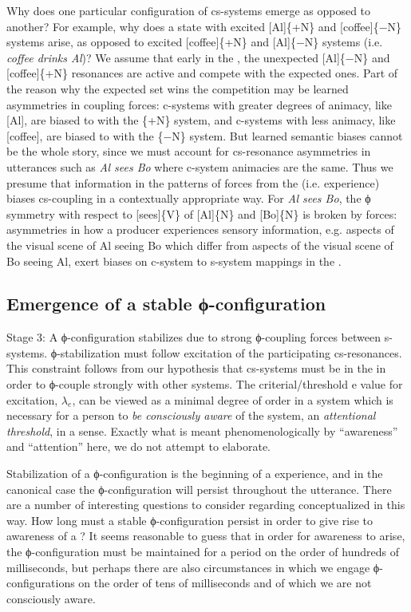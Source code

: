Why does one particular configuration of cs-systems emerge as opposed to another? For example, why does a state with excited [Al]\{+N\} and [coffee]\{−N\} systems arise, as opposed to excited [coffee]\{+N\} and [Al]\{−N\} systems (i.e. \textit{coffee drinks Al})? We assume that early in the , the unexpected [Al]\{−N\} and [coffee]\{+N\} resonances are active and compete with the expected ones. Part of the reason why the expected set wins the competition may be learned asymmetries in coupling forces: c-systems with greater degrees of animacy, like [Al], are biased to  with the \{+N\} system, and c-systems with less animacy, like [coffee], are biased to  with the \{−N\} system. But learned semantic biases cannot be the whole story, since we must account for cs-resonance asymmetries in utterances such as \textit{Al sees Bo} where c-system animacies are the same. Thus we presume that information in the patterns of forces from the  (i.e.  experience) biases cs-coupling in a contextually appropriate way. For \textit{Al sees Bo}, the ϕ symmetry with respect to [sees]\{V\} of [Al]\{N\} and [Bo]\{N\} is broken by  forces: asymmetries in how a producer experiences sensory information, e.g. aspects of the visual scene of Al seeing Bo which differ from aspects of the visual scene of Bo seeing Al, exert biases on c-system to s-system mappings in the .

\subsection{Emergence of a stable ϕ-configuration}

Stage 3: A ϕ-configuration stabilizes due to strong ϕ{}-coupling forces between s-systems. ϕ{}-stabilization must follow excitation of the participating cs-resonances. This constraint follows from our hypothesis that cs-systems must be in the  in order to ϕ-couple strongly with other systems. The criterial/threshold e value for excitation, $\lambda_{e}$, can be viewed as a minimal degree of order in a system which is necessary for a person to \textit{be consciously aware} of the system, an \textit{attentional threshold}, in a sense. Exactly what is meant phenomenologically by “awareness” and “attention” here, we do not attempt to elaborate. 

Stabilization of a ϕ-configuration is the beginning of a  experience, and in the canonical case the ϕ-configuration will persist throughout the utterance. There are a number of interesting questions to consider regarding  conceptualized in this way. How long must a stable ϕ-configuration persist in order to give rise to awareness of a ? It seems reasonable to guess that in order for awareness to arise, the ϕ-configuration must be maintained for a period on the order of hundreds of milliseconds, but perhaps there are also circumstances in which we engage ϕ-configurations on the order of tens of milliseconds and of which we are not consciously aware.

